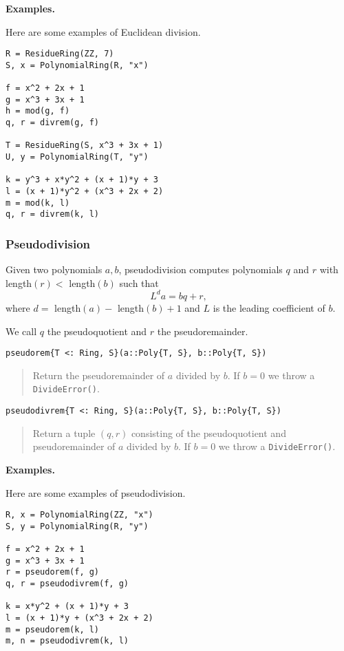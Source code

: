 \documentclass[a4paper,10pt]{article}
\newcommand{\code}{\lstinline}
\newcommand{\desc}[1]{\vspace{-3mm}\begin{quote}#1\end{quote}}
\begin{document}
{{{\textbf{Examples.}

Here are some examples of Euclidean division.

\begin{lstlisting}
R = ResidueRing(ZZ, 7)
S, x = PolynomialRing(R, "x")

f = x^2 + 2x + 1
g = x^3 + 3x + 1
h = mod(g, f)
q, r = divrem(g, f)

T = ResidueRing(S, x^3 + 3x + 1)
U, y = PolynomialRing(T, "y")

k = y^3 + x*y^2 + (x + 1)*y + 3
l = (x + 1)*y^2 + (x^3 + 2x + 2)
m = mod(k, l)
q, r = divrem(k, l)
\end{lstlisting}

\subsubsection{Pseudodivision}

Given two polynomials $a, b$, pseudodivision computes polynomials $q$ and $r$
with length$(r) <$ length$(b)$ such that
$$L^d a = bq + r,$$
where $d =$ length$(a) -$ length$(b) + 1$ and $L$ is the leading coefficient
of $b$.

We call $q$ the pseudoquotient and $r$ the pseudoremainder.

\begin{lstlisting}
pseudorem{T <: Ring, S}(a::Poly{T, S}, b::Poly{T, S})
\end{lstlisting}

\desc{Return the pseudoremainder of $a$ divided by $b$. If $b = 0$ we throw a 
\code{DivideError()}.}

\begin{lstlisting}
pseudodivrem{T <: Ring, S}(a::Poly{T, S}, b::Poly{T, S})
\end{lstlisting}

\desc{Return a tuple $(q, r)$ consisting of the pseudoquotient and pseudoremainder 
of $a$ divided by $b$. If $b = 0$ we throw a \code{DivideError()}.}

\textbf{Examples.}

Here are some examples of pseudodivision.

\begin{lstlisting}
R, x = PolynomialRing(ZZ, "x")
S, y = PolynomialRing(R, "y")

f = x^2 + 2x + 1
g = x^3 + 3x + 1
r = pseudorem(f, g)
q, r = pseudodivrem(f, g)

k = x*y^2 + (x + 1)*y + 3
l = (x + 1)*y + (x^3 + 2x + 2)
m = pseudorem(k, l)
m, n = pseudodivrem(k, l)
\end{lstlisting}

}}}
\end{document}
